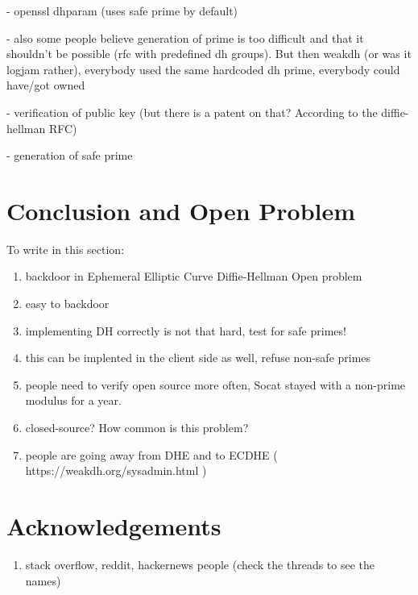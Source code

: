 \documentclass[a4paper,11pt,twocolumn]{article}
\begin{document}
- openssl dhparam (uses safe prime by default)

- also some people believe generation of prime is too difficult and that it shouldn't be possible (rfc with predefined dh groups). But then weakdh (or was it logjam rather), everybody used the same hardcoded dh prime, everybody could have/got owned

- verification of public key (but there is a patent on that? According to the diffie-hellman RFC)

- generation of safe prime


\section{Conclusion and Open Problem}

To write in this section:

\begin{enumerate}
\item backdoor in Ephemeral Elliptic Curve Diffie-Hellman Open problem
\item easy to backdoor
\item  implementing DH correctly is not that hard, test for safe primes!
\item  this can be implented in the client side as well, refuse non-safe primes
\item  people need to verify open source more often, Socat stayed with a non-prime modulus for a year.
\item  closed-source? How common is this problem?
\item  people are going away from DHE and to ECDHE ( https://weakdh.org/sysadmin.html )
\end{enumerate}

\newpage
\newpage

\section*{Acknowledgements}

\begin{enumerate}
    \item stack overflow, reddit, hackernews people (check the threads to see the names)
\end{enumerate}

\newpage
\end{document}
